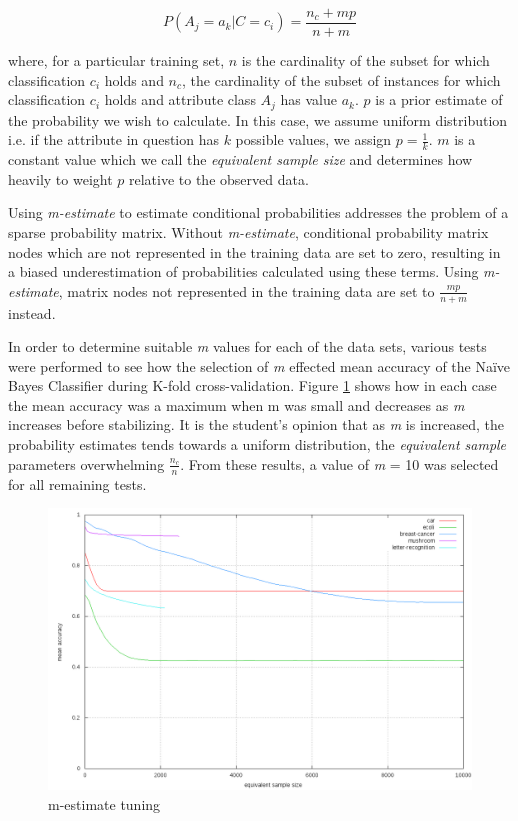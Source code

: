 \documentclass[10pt]{report}
\begin{document}
\begin{equation*}
P(A_{j}=a_{k}|C=c_{i}) = \frac{n_{c} + mp}{n + m}
\end{equation*}

where, for a particular training set, \(n\) is the cardinality of the
subset for which classification \(c_i\) holds and \(n_c\), the
cardinality of the subset of instances for which classification
\(c_i\) holds and attribute class \(A_j\) has value \(a_k\). \(p\) is
a prior estimate of the probability we wish to calculate. In this
case, we assume uniform distribution i.e. if the attribute in question
has \(k\) possible values, we assign \(p = \frac{1}{k}\). \(m\) is a
constant value which we call the \textit{equivalent sample size} and
determines how heavily to weight \(p\) relative to the observed
data. 

Using \textit{m-estimate} to estimate conditional probabilities
addresses the problem of a sparse probability matrix. Without
\textit{m-estimate}, conditional probability matrix nodes which are
not represented in the training data are set to zero, resulting in a
biased underestimation of probabilities calculated using these terms. Using
\textit{m-estimate}, matrix nodes not represented in the training data
are set to \(\frac{mp}{n + m}\) instead.

In order to determine suitable \textit{m} values for each of the data
sets, various tests were performed to see how the selection of
\textit{m} effected mean accuracy of the Na\"{i}ve Bayes Classifier
during K-fold cross-validation. Figure \ref{fig:mlog} shows how in
each case the mean accuracy was a maximum when m was small and
decreases as \textit{m} increases before stabilizing. It is the
student's opinion that as \textit{m} is increased, the probability
estimates tends towards a uniform distribution, the \textit{equivalent sample}
parameters overwhelming \(\frac{n_c}{n}\). From these results, a value
of \textit{m} = 10 was selected for all remaining tests.

\begin{figure}
  \begin{center}
	\includegraphics[width=\textwidth,height=!]{mlog}
  \end{center}
  \caption{m-estimate tuning}
  \label{fig:mlog}
\end{figure} 
\end{document}
